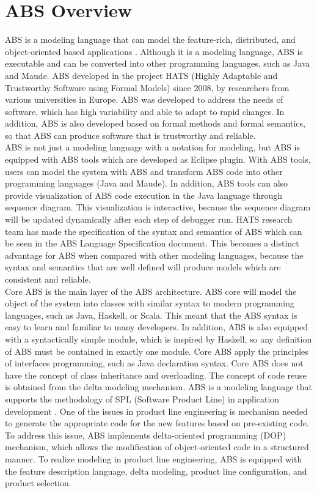 \documentclass[conference]{IEEEtran}
\begin{document}
\section{ABS Overview}
ABS is a modeling language that can model the feature-rich, distributed, and object-oriented based applications \cite{lncschap}. Although it is a modeling language, ABS is executable and can be converted into other programming languages, such as Java and Maude. ABS developed in the project HATS (Highly Adaptable and Trustworthy Software using Formal Models) since 2008, by researchers from various universities in Europe. ABS was developed to address the needs of software, which has high variability and able to adapt to rapid changes. In addition, ABS is also developed based on formal methods and formal semantics, so that ABS can produce software that is trustworthy and reliable.
\\
ABS is not just a modeling language with a notation for modeling, but ABS is equipped with ABS tools which are developed as Eclipse plugin. With ABS tools, users can model the system with ABS and transform ABS code into other programming languages (Java and Maude). In addition, ABS tools can also provide visualization of ABS code execution in the Java language through sequence diagram. This visualization is interactive, because the sequence diagram will be updated dynamically after each step of debugger run. HATS research team has made the specification of the syntax and semantics of ABS which can be seen in the ABS Language Specification document. This becomes a distinct advantage for ABS when compared with other modeling languages, because the syntax and semantics that are well defined will produce models which are consistent and reliable.
\\
Core ABS is the main layer of the ABS architecture. ABS core will model the object of the system into classes with similar syntax to modern programming languages, such as Java, Haskell, or Scala. This meant that the ABS syntax is easy to learn and familiar to many developers. In addition, ABS is also equipped with a syntactically simple module, which is inspired by Haskell, so any definition of ABS must be contained in exactly one module. Core ABS apply the principles of interfaces programming, such as Java declaration syntax. Core ABS does not have the concept of class inheritance and overloading. The concept of code reuse is obtained from the delta modeling mechanism.
ABS is a modeling language that supports the methodology of SPL (Software Product Line) in application development \cite{lncschap}. One of the issues in product line engineering is mechanism needed to generate the appropriate code for the new features based on pre-existing code. To address this issue, ABS implements delta-oriented programming (DOP) mechanism, which allows the modification of object-oriented code in a structured manner. To realize modeling in product line engineering, ABS is equipped with the feature description language, delta modeling, product line configuration, and product selection.
\end{document}
